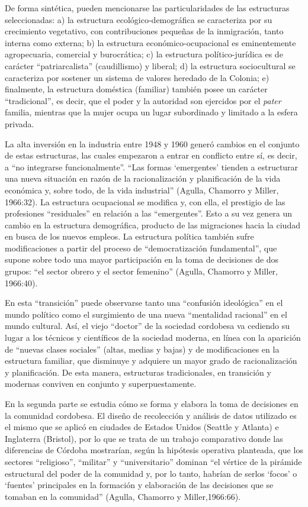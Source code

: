 De forma sintética, pueden mencionarse las particularidades de las estructuras seleccionadas: a) la estructura ecológico-demográfica se caracteriza por su crecimiento vegetativo, con contribuciones pequeñas de la inmigración, tanto interna como externa; b) la estructura económico-ocupacional es eminentemente agropecuaria, comercial y burocrática; c) la estructura político-jurídica es de carácter \enquote{patriarcalista} (caudillismo) y liberal; d) la estructura sociocultural se caracteriza por sostener un sistema de valores heredado de la Colonia; e) finalmente, la estructura doméstica (familiar) también posee un carácter \enquote{tradicional}, es decir, que el poder y la autoridad son ejercidos por el \emph{pater} familia, mientras que la mujer ocupa un lugar subordinado y limitado a la esfera privada.

La alta inversión en la industria entre 1948 y 1960 generó cambios en el conjunto de estas estructuras, las cuales empezaron a entrar en conflicto entre sí, es decir, a \enquote{no integrarse funcionalmente}. \enquote{Las formas \enquote{emergentes} tienden a estructurar una nueva situación en razón de la racionalización y planificación de la vida económica y, sobre todo, de la vida industrial} (Agulla, Chamorro y Miller, 1966:32). La estructura ocupacional se modifica y, con ella, el prestigio de las profesiones \enquote{residuales} en relación a las \enquote{emergentes}. Esto a su vez genera un cambio en la estructura demográfica, producto de las migraciones hacia la ciudad en busca de los nuevos empleos. La estructura política también sufre modificaciones a partir del proceso de \enquote{democratización fundamental}, que supone sobre todo una mayor participación en la toma de decisiones de dos grupos: \enquote{el sector obrero y el sector femenino} (Agulla, Chamorro y Miller, 1966:40).

En esta \enquote{transición} puede observarse tanto una \enquote{confusión ideológica} en el mundo político como el surgimiento de una nueva \enquote{mentalidad racional} en el mundo cultural. Así, el viejo \enquote{doctor} de la sociedad cordobesa va cediendo su lugar a los técnicos y científicos de la sociedad moderna, en línea con la aparición de \enquote{nuevas clases sociales} (altas, medias y bajas) y de modificaciones en la estructura familiar, que disminuye y adquiere un mayor grado de racionalización y planificación. De esta manera, estructuras tradicionales, en transición y modernas conviven en conjunto y superpuestamente.

En la segunda parte se estudia cómo se forma y elabora la toma de decisiones en la comunidad cordobesa. El diseño de recolección y análisis de datos utilizado es el mismo que se aplicó en ciudades de Estados Unidos (Seattle y Atlanta) e Inglaterra (Bristol), por lo que se trata de un trabajo comparativo donde las diferencias de Córdoba mostrarían, según la hipótesis operativa planteada, que los sectores \enquote{religioso}, \enquote{militar} y \enquote{universitario} dominan \enquote{el vértice de la pirámide estructural del poder de la comunidad y, por lo tanto, habrían de serlos \enquote{focos} o \enquote{fuentes} principales en la formación y elaboración de las decisiones que se tomaban en la comunidad} (Agulla, Chamorro y Miller,1966:66).

